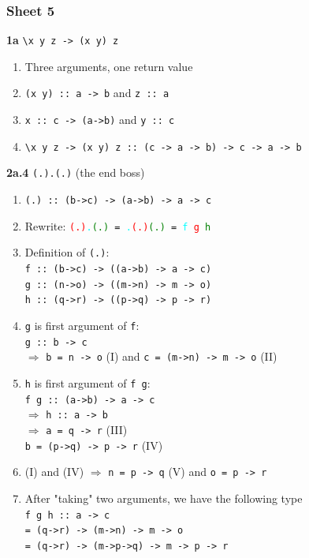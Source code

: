 \documentclass{article}
\begin{document}
\subsubsection{Sheet 5}
\textbf{1a} \verb|\x y z -> (x y) z|
\begin{enumerate}
    \item Three arguments, one return value
    \item \verb|(x y) :: a -> b| and \verb|z :: a|
    \item \verb|x :: c -> (a->b)| and \verb|y :: c|
    \item \verb|\x y z -> (x y) z :: (c -> a -> b) -> c -> a -> b|
\end{enumerate}
\textbf{2a.4} \texttt{(.).(.)} (the end boss)
\begin{enumerate}
    \item \texttt{(.) :: (b->c) -> (a->b) -> a -> c}
    \item Rewrite: \texttt{\textcolor{Red}{(.)}\textcolor{Cyan}{.}\textcolor{Green}{(.)} 
    = \textcolor{Cyan}{.}\textcolor{Red}{(.)}\textcolor{Green}{(.)} 
    = \textcolor{Cyan}{f} \textcolor{Red}{g} \textcolor{Green}{h}}
    \item Definition of \texttt{(.)}: \\
    \texttt{f :: (b->c) -> ((a->b) -> a -> c)} \\
    \texttt{g :: (n->o) -> ((m->n) -> m -> o)} \\
    \texttt{h :: (q->r) -> ((p->q) -> p -> r)} 
    \item \texttt{g} is first argument of \texttt{f}: \\
    \texttt{g :: b -> c} \\
    $\Rightarrow$ \texttt{b = n -> o} (I) and
    \texttt{c = (m->n) -> m -> o} (II)
    \item \texttt{h} is first argument of \texttt{f g}:\\
    \texttt{f g :: (a->b) -> a -> c}   \\
    $\Rightarrow$ \texttt{h :: a -> b}  \\
    $\Rightarrow$ \texttt{a = q -> r} (III)\\
    \texttt{b = (p->q) -> p -> r} (IV)
    \item (I) and (IV) $\Rightarrow$ 
    \texttt{n = p -> q} (V) and \texttt{o = p -> r}
    \item After "taking" two arguments, we have the following type \\
    \texttt{f g h :: a -> c} \\
    \texttt{= (q->r) -> (m->n) -> m -> o} \\
    \texttt{= (q->r) -> (m->p->q) -> m -> p -> r }
\end{enumerate}
\end{document}
